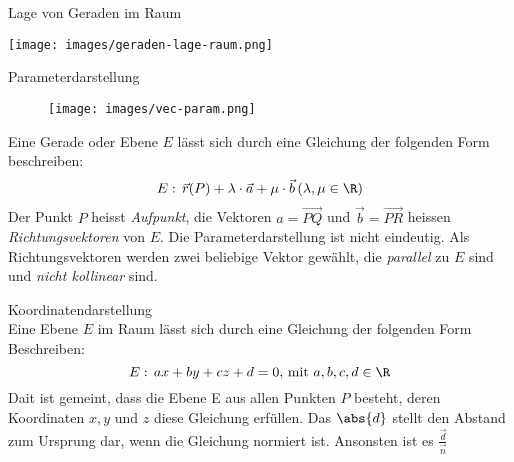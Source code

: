     \begin{theorem}{Lage von Geraden im Raum}
        \begin{center}
            \texttt{[image: images/geraden-lage-raum.png]}
        \end{center}
    \end{theorem}

    \begin{definition}{Parameterdarstellung}
        \begin{wrapfigure}{r}{0.3\linewidth}
            \texttt{[image: images/vec-param.png]}
        \end{wrapfigure}
        Eine Gerade oder Ebene $E$ lässt sich durch eine Gleichung der folgenden Form beschreiben:
        \begin{equation*}
            E:\,\vec{r}(P)+\lambda\cdot\vec{a}+\mu\cdot\vec{b}\, (\lambda,\mu\in\R)
        \end{equation*}
        Der Punkt $P$ heisst \textit{Aufpunkt}, die Vektoren $a=\overrightarrow{PQ}$ und 
        $\vec{b}=\overrightarrow{PR}$ heissen \textit{Richtungsvektoren} von $E$.
        Die Parameterdarstellung ist nicht eindeutig. Als Richtungsvektoren werden zwei beliebige
        Vektor gewählt, die \textit{parallel} zu $E$ sind und \textit{nicht kollinear} sind.
    \end{definition}

    \begin{definition}{Koordinatendarstellung}\\
        Eine Ebene $E$ im Raum lässt sich durch eine Gleichung der folgenden Form Beschreiben:
        \begin{equation*}
            E:\,ax+by+cz+d=0,\, \text{mit } a,b,c,d\in \R
        \end{equation*}
        Dait ist gemeint, dass die Ebene E aus allen Punkten $P$ besteht, deren Koordinaten
        $x, y$ und $z$ diese Gleichung erfüllen.
        Das $\abs{d}$ stellt den Abstand zum Ursprung dar, wenn die Gleichung normiert ist. 
        Ansonsten ist es $\frac{\vec{d}}{\vec{n}}$ 
    \end{definition}

